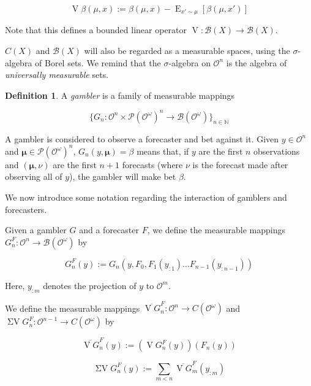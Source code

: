 \documentclass[11pt]{article}
\theoremstyle{definition}
\newtheorem{definition}{Definition}%
\theoremstyle{plain}
\newcommand{\Nats}{\mathbb{N}}
\newcommand{\Sq}[2]{\{#1\}_{#2 \in \Nats}}
\newcommand{\Sqn}[1]{\Sq{#1}{n}}
\DeclareMathOperator{\E}{E}
\newcommand{\PM}{\mathcal{P}}
\newcommand{\Ob}{\mathcal{O}}
\newcommand{\OO}{\Ob^\omega}
\newcommand{\PMO}{\PM(\OO)}
\newcommand{\Gm}{\mathcal{B}}
\newcommand{\GMO}{\Gm(\OO)}
\newcommand{\CO}{C(\OO)}
\DeclareMathOperator{\V}{V}
\DeclareMathOperator{\SV}{\Sigma V}
\newcommand{\BM}{\bm{\mu}}
\begin{document}
\begin{equation}
\V{\beta}\left(\mu,x\right):=\beta\left(\mu,x\right) - \E_{x' \sim \mu}[\beta\left(\mu,x'\right)]
\end{equation}

Note that this defines a bounded linear operator $\V: \Gm\left(X\right) \rightarrow \Gm\left(X\right)$.

$C\left(X\right)$ and $\Gm\left(X\right)$ will also be regarded as a measurable spaces, using the $\sigma$-algebra of Borel sets. We remind that the $\sigma$-algebra on $\Ob^n$ is the algebra of \emph{universally measurable} sets.

\begin{definition}

A \emph{gambler} is a family of measurable mappings

\[\Sqn{G_n : \Ob^n \times \PMO^n \rightarrow \Gm\left(\OO\right)}\]

\end{definition}

A gambler is considered to observe a forecaster and bet against it. Given $y \in \Ob^n$ and $\BM \in \PMO^n$, $G_n\left(y,\BM\right)=\beta$ means that, if $y$ are the first $n$ observations and $\left(\BM,\nu\right)$ are the first $n + 1$ forecasts (where $\nu$ is the forecast made after observing all of $y$), the gambler will make bet $\beta$.

We now introduce some notation regarding the interaction of gamblers and forecasters. 

Given a gambler $G$ and a forecaster $F$, we define the measurable mappings $G^F_n: \Ob^n \rightarrow \GMO$ by

\begin{equation}
\label{eqn:GF}
G^F_n\left(y\right):=G_n\left(y,F_0,F_1\left(y_{:1}\right) \ldots F_{n-1}\left(y_{:n-1}\right)\right)
\end{equation}

Here, $y_{:m}$ denotes the projection of $y$ to $\Ob^m$.

We define the measurable mappings $\overline{\V G}^F_n: \Ob^n \rightarrow \CO$ and $\SV G^F_n: \Ob^{n-1} \rightarrow \CO$ by

\begin{equation}
\overline{\V G}^F_n\left(y\right):=\left(\V G^F_n\left(y\right)\right)\left(F_n\left(y\right)\right)
\end{equation}

\begin{equation}
\SV G^F_n\left(y\right) := \sum_{m < n} \overline{\V G}^F_m\left(y_{:m}\right)
\end{equation}
\end{document}
